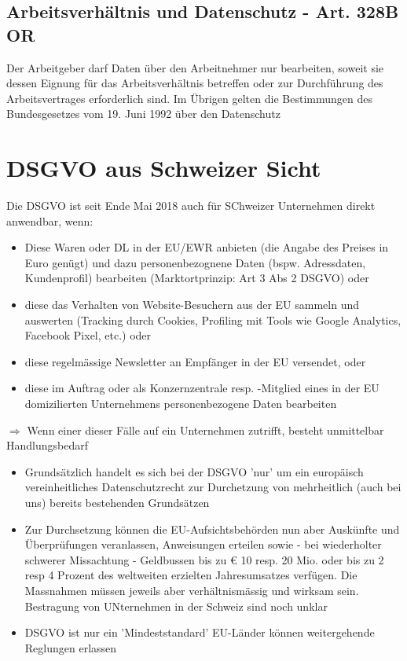 \documentclass{report}
\theoremstyle{definition}
\theoremstyle{example}
\begin{document}
\subsection{Arbeitsverhältnis und Datenschutz - Art. 328B OR}
Der Arbeitgeber darf Daten über den Arbeitnehmer nur
bearbeiten, soweit sie dessen Eignung für das
Arbeitsverhältnis betreffen oder zur Durchführung des
Arbeitsvertrages erforderlich sind. Im Übrigen gelten die
Bestimmungen des Bundesgesetzes vom 19. Juni 1992 über
den Datenschutz


\section{DSGVO aus Schweizer Sicht}
Die DSGVO ist seit Ende Mai 2018 auch für SChweizer Unternehmen direkt anwendbar, wenn:
\begin{itemize}
   \item Diese Waren oder DL in der EU/EWR anbieten (die Angabe des Preises in Euro genügt) und dazu personenbezognene Daten (bspw. Adressdaten, Kundenprofil) bearbeiten (Marktortprinzip: Art 3 Abs 2 DSGVO) oder
   \item diese das Verhalten von Website-Besuchern aus der EU sammeln und auswerten (Tracking durch Cookies, Profiling mit Tools wie Google Analytics, Facebook Pixel, etc.) oder
   \item diese regelmässige Newsletter an Empfänger in der EU versendet, oder
   \item diese im Auftrag oder als Konzernzentrale resp. -Mitglied eines in der EU domizilierten Unternehmens personenbezogene Daten bearbeiten
\end{itemize}
$\Rightarrow$ Wenn einer dieser Fälle auf ein Unternehmen zutrifft, besteht unmittelbar Handlungsbedarf

\begin{itemize}
   \item Grundsätzlich handelt es sich bei der DSGVO 'nur' um ein europäisch vereinheitliches Datenschutzrecht zur Durchetzung von mehrheitlich (auch bei uns) bereits bestehenden Grundsätzen
   \item Zur Durchsetzung können die EU-Aufsichtsbehörden nun aber Auskünfte und Überprüfungen veranlassen, Anweisungen erteilen sowie - bei wiederholter schwerer Missachtung - Geldbussen bis zu € 10 resp. 20 Mio. oder bis zu 2 resp 4 Prozent des weltweiten erzielten Jahresumsatzes verfügen. Die Massnahmen müssen jeweils aber verhältnismässig und wirksam sein. Bestragung von UNternehmen in der Schweiz sind noch unklar
   \item DSGVO ist nur ein 'Mindeststandard' EU-Länder können weitergehende Reglungen erlassen
\end{itemize}
\end{document}
